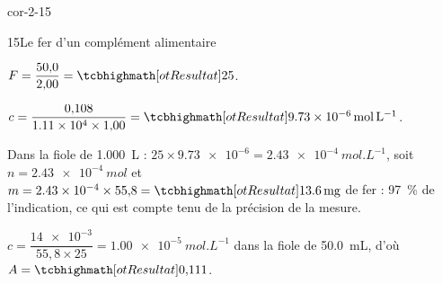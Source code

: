 \begin{blocLivre}{cor-2-15}
\begin{corrige}{15}{Le fer d'un complément alimentaire}
\begin{questions}
\item $F=\dfrac{50{,}0}{2{,}00}=\res{25}$.
\item $c=\dfrac{0{,}108}{\num{1.11e4}\times1{,}00}=\res{\qty{9,73e-6}{mol.L^{-1}}}$.
\item Dans la fiole de \qty{1,000}{L} : $25\times\num{9.73e-6}=\qty{2,43e-4}{mol.L^{-1}}$, soit $n=\qty{2,43e-4}{mol}$ et $m=\num{2.43e-4}\times55{,}8=\res{\qty{13,6}{mg}}$ de fer :
97~\% de l'indication, ce qui est  compte tenu de la précision de la mesure.
\item $c=\dfrac{\num{14e-3}}{55{,}8\times25}=\qty{1,00e-5}{mol.L^{-1}}$ dans la fiole de \qty{50,0}{mL}, d'où $A=\res{0{,}111}$.
\end{questions}
\end{corrige}
\end{blocLivre}
